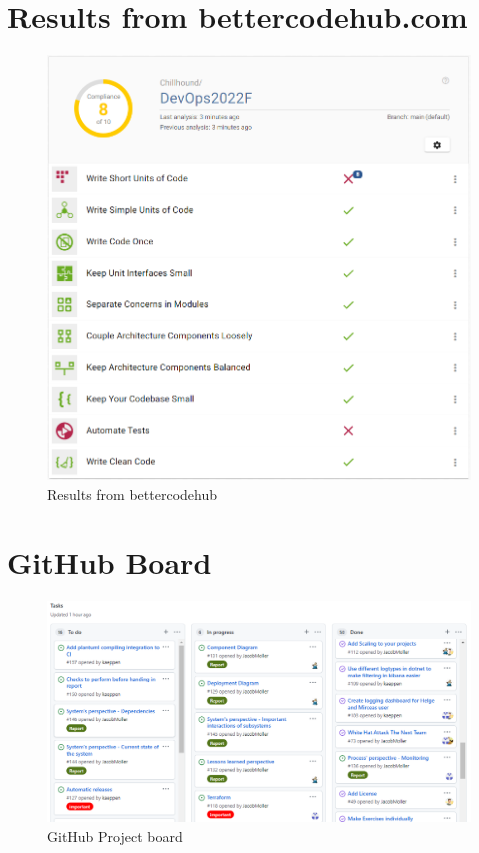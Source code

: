 \section{Results from bettercodehub.com}\label{app:bettercodehub}
\begin{figure}[H]
    \centering
    \includegraphics[scale=0.55]{images/BetterCodeHubResults.PNG}
    \caption{Results from bettercodehub}
\end{figure}

\section{GitHub Board}\label{app:githubboard}
\begin{figure}[H]
    \centering
    \includegraphics[scale=0.6]{images/githubBoard.PNG}
    \caption{GitHub Project board}
\end{figure}

